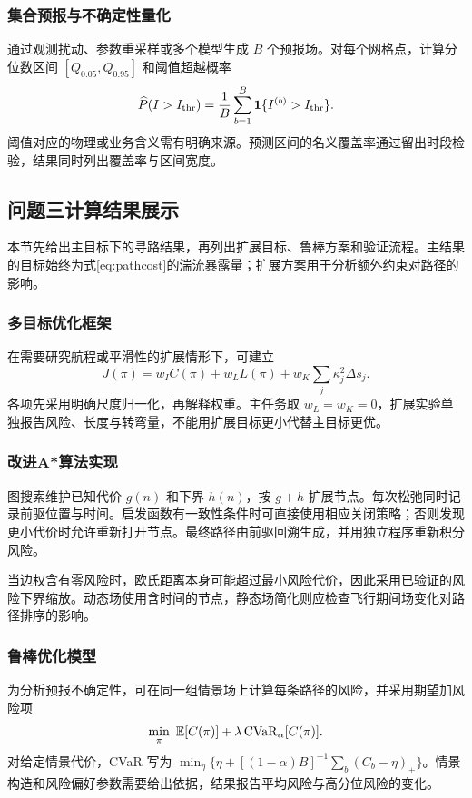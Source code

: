 \subsubsection{集合预报与不确定性量化}
通过观测扰动、参数重采样或多个模型生成 $B$ 个预报场。对每个网格点，计算分位数区间 $[Q_{0.05},Q_{0.95}]$ 和阈值超越概率
\begin{equation}
\widehat P(I>I_{\rm thr})=\frac1B\sum_{b=1}^{B}\mathbf1\{I^{(b)}>I_{\rm thr}\}.
\end{equation}
阈值对应的物理或业务含义需有明确来源。预测区间的名义覆盖率通过留出时段检验，结果同时列出覆盖率与区间宽度。
\subsection{问题三计算结果展示}
本节先给出主目标下的寻路结果，再列出扩展目标、鲁棒方案和验证流程。主结果的目标始终为式\eqref{eq:pathcost}的湍流暴露量；扩展方案用于分析额外约束对路径的影响。
\subsubsection{多目标优化框架}
在需要研究航程或平滑性的扩展情形下，可建立
\begin{equation}
J(\pi)=w_IC(\pi)+w_LL(\pi)+w_K\sum_j\kappa_j^2\Delta s_j.
\end{equation}
各项先采用明确尺度归一化，再解释权重。主任务取 $w_L=w_K=0$，扩展实验单独报告风险、长度与转弯量，不能用扩展目标更小代替主目标更优。
\subsubsection{改进A*算法实现}
图搜索维护已知代价 $g(n)$ 和下界 $h(n)$，按 $g+h$ 扩展节点。每次松弛同时记录前驱位置与时间。启发函数有一致性条件时可直接使用相应关闭策略；否则发现更小代价时允许重新打开节点。最终路径由前驱回溯生成，并用独立程序重新积分风险。

当边权含有零风险时，欧氏距离本身可能超过最小风险代价，因此采用已验证的风险下界缩放。动态场使用含时间的节点，静态场简化则应检查飞行期间场变化对路径排序的影响。
\subsubsection{鲁棒优化模型}
为分析预报不确定性，可在同一组情景场上计算每条路径的风险，并采用期望加风险项
\begin{equation}
\min_\pi\ \E[C(\pi)]+\lambda\operatorname{CVaR}_\alpha[C(\pi)].
\end{equation}
对给定情景代价，CVaR 写为 $\min_\eta\{\eta+[(1-\alpha)B]^{-1}\sum_b(C_b-\eta)_+\}$。情景构造和风险偏好参数需要给出依据，结果报告平均风险与高分位风险的变化。
